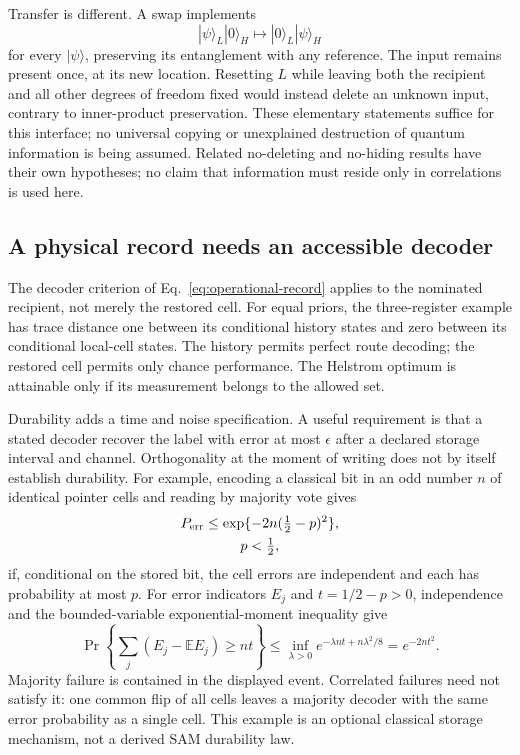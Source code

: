 Transfer is different. A swap implements
\begin{equation}
 |\psi\rangle_L|0\rangle_H\longmapsto
 |0\rangle_L|\psi\rangle_H
\end{equation}
for every $|\psi\rangle$, preserving its entanglement with any reference.
The input remains present once, at its new location. Resetting $L$
while leaving both the recipient and all other degrees of freedom fixed
would instead delete an unknown input, contrary to inner-product
preservation. These elementary statements suffice for this interface;
no universal copying or unexplained destruction of quantum information is being assumed. Related no-deleting and no-hiding results have their own hypotheses; no claim that information must reside only in correlations is used here.\cite{PatiBraunstein2000,BraunsteinPati2007}

\subsection{A physical record needs an accessible decoder}
\label{subsec:accessible-decoder}

The decoder criterion of Eq.~\eqref{eq:operational-record} applies to the nominated recipient, not merely the restored cell. For equal priors, the three-register example has trace distance one between its conditional history states and zero between its conditional local-cell states. The history permits perfect route decoding; the restored cell permits only chance performance. The Helstrom optimum is attainable only if its measurement belongs to the allowed set.

Durability adds a time and noise specification. A useful requirement is
that a stated decoder recover the label with error at most $\epsilon$
after a declared storage interval and channel. Orthogonality at the moment
of writing does not by itself establish durability. For example, encoding
a classical bit in an odd number $n$ of identical pointer cells and
reading by majority vote gives
\begin{equation}
\begin{gathered}
P_{\rm err}\le
 \exp\{-2n(\tfrac12-p)^2\},\\
 p<\tfrac12,
\end{gathered}
\end{equation}
if, conditional on the stored bit, the cell errors are independent and
each has probability at most $p$. For error indicators $E_j$ and $t=1/2-p>0$, independence and the
bounded-variable exponential-moment inequality give
\begin{equation}
 \Pr\!\left\{\sum_j(E_j-\mathbb E E_j)\ge nt\right\}
 \le \inf_{\lambda>0}e^{-\lambda nt+n\lambda^2/8}
 =e^{-2nt^2}.
\end{equation}
Majority failure is contained in the displayed event. Correlated failures need not satisfy it: one
common flip of all cells leaves a majority decoder with the same error
probability as a single cell. This example is an optional classical
storage mechanism, not a derived SAM durability law.

